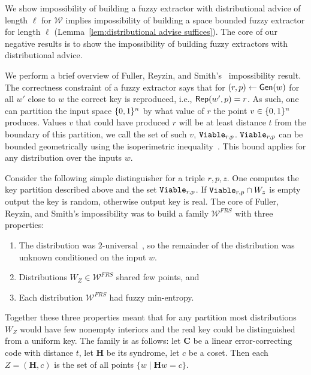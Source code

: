 We show impossibility of building a fuzzy extractor with distributional advice of length $\ell$ for $\mathcal{W}$ implies impossibility of building a space bounded fuzzy extractor for length $\ell$ (Lemma~\ref{lem:distributional advise suffices}). 
The core of our negative results is to show the impossibility of building fuzzy extractors with distributional advice.   

We perform a brief overview of Fuller, Reyzin, and Smith's~\cite{fuller2020fuzzy} impossibility result.
The correctness constraint of a fuzzy extractor says that for $(r, p)\leftarrow {\ensuremath{\mathsf{Gen}}}(w)$ for all $w'$ close to $w$ the correct key is reproduced, i.e., ${\mathsf{Rep}}(w', p)=r$.  As such, one can partition the input space $\{0, 1\}^n$ by what value of $r$ the point  $v\in \{0, 1\}^n$ produces.  Values $v$ that could have produced  $r$ will be at least distance $t$ from the boundary of this partition, we call the set of such $v$, $\mathtt{Viable}_{r,p}$.  $\mathtt{Viable}_{r,p}$ can be bounded geometrically using the isoperimetric inequality~\cite{harper1966optimal}.  This bound applies for any distribution over the inputs $w$.

Consider the following simple distinguisher for a triple $r, p, z$.  One computes the key partition described above and the set $\mathtt{Viable}_{r,p}$. If $\mathtt{Viable}_{r,p} \cap W_z $ is empty output the key is random, otherwise output key is real. 
The core of Fuller, Reyzin, and Smith's impossibility was to build a family $\mathcal{W}^{FRS}$ with three properties:
\begin{enumerate}
\item The distribution was $2$-universal~\cite{carter1977universal}, so the remainder of the distribution was unknown conditioned on the input $w$. 
\item Distributions $W_Z \in \mathcal{W}^{FRS}$ shared few points, and 
\item Each distribution $\mathcal{W}^{FRS}$ had fuzzy min-entropy.
\end{enumerate}
Together these three properties meant that for any partition most distributions $W_Z$ would have few nonempty interiors and the real key could be distinguished from a uniform key.  
The family is as follows: let $\mathbf{C}$ be a linear error-correcting code with distance $t$, let $\mathbf{H}$ be its syndrome, let $c$ be a coset.  Then each $Z = (\mathbf{H}, c)$ is the set of all points $\{w \mid \mathbf{H} w = c\}$.

